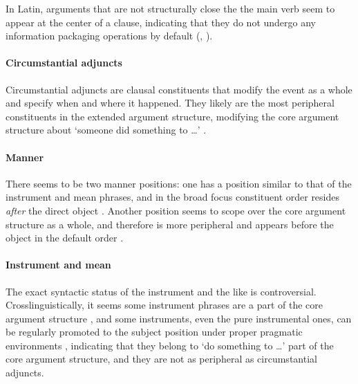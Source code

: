 \documentclass[a4paper, oneside, 12pt]{report}
\newcommand*{\citepage}[1]{p.~{#1}}
\newcommand*{\citepages}[1]{pp.~{#1}}
\newcommand{\translate}[1]{`#1'}
\begin{document}
In Latin, arguments that are not structurally close the the main verb
seem to appear at the center of a clause,
indicating that they do not undergo any information packaging operations by default 
(, ).

\paragraph*{Circumstantial adjuncts}
Circumstantial adjuncts are clausal constituents that
modify the event as a whole and specify when and where it happened.
They likely are the most peripheral constituents in the extended argument structure,
modifying the core argument structure about \translate{someone did something to \dots}
\citep[\citepage{29}]{cinque1999adverbs}.

\paragraph*{Manner}
There seems to be two manner positions:
one has a position similar to that of the instrument and mean phrases,
and in the broad focus constituent order resides \emph{after} the direct object
\citep[\citepage{71-75}]{devine2006latin}.
Another position seems to scope over the core argument structure as a whole,
and therefore is more peripheral and appears before the object
in the default order
\cite[\citepages{101-109}]{devine2006latin}. 

\paragraph*{Instrument and mean}
\label{sec:grammatical.clause.peripheral.instrument}
The exact syntactic status of the instrument and the like is controversial.
Crosslinguistically, it seems some instrument phrases are a part of the core argument structure
\citep{pascual2001syntactic},
and some instruments, even the pure instrumental ones, 
can be regularly promoted to the subject position
under proper pragmatic environments \citep{alexiadou2008instrument},
indicating that they belong to \translate{do something to \dots} part of the core argument structure,
and they are not as peripheral as circumstantial adjuncts. 
\end{document}
